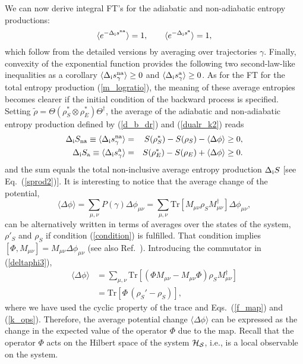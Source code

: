 \documentclass[aps,prx,twocolumn,showpacs,floatfix,superscriptaddress,graphics,longbibliography]{revtex4-1}
\newcommand{\tr}{\mathrm{Tr}}
\newcommand{\HAT}{}
\begin{document}
We can now derive integral FT's for the adiabatic and non-adiabatic entropy productions:
\begin{equation}\label{i-FT}
\langle e^{- \Delta_{\rm i} s^{\rm na}} \rangle = 1, \qquad \langle e^{- \Delta_{\rm i} s^{\rm a}} \rangle = 1,
\end{equation}
which follow from the detailed versions by averaging over trajectories $\gamma$. 
Finally, convexity of the exponential function provides the following two second-law-like inequalities as a corollary $\langle \Delta_{\rm i} s^{\rm na}_\gamma \rangle \ge 0$ and $\langle \Delta_{\rm i} s^{\rm a}_\gamma \rangle \ge 0$. 
As for the FT for the total entropy production (\ref{m_logratio}), the meaning of these average entropies becomes clearer if the initial condition of the backward process is specified. 
Setting $ \tilde{\rho}= \HAT\Theta (\rho_S^\ast \otimes \rho_E^*) \HAT\Theta^\dagger$, the average of the adiabatic and non-adiabatic entropy production defined by (\ref{d_b_dr}) and  (\ref{dualr_k2}) reads
\begin{eqnarray} \label{second-law-like1}
\Delta_{\rm i} S_{\rm na}\equiv \langle \Delta_{\rm i} s^{\rm na}_\gamma \rangle &=& S(\rho_S^\ast) - S(\rho_S) - \langle\Delta \phi\rangle \ge 0,  \\ \label{second-law-like2}
\Delta_{\rm i} S_{\rm a} \equiv\langle \Delta_{\rm i} s^{\rm a}_\gamma \rangle &=& S(\rho_E^\ast) - S(\rho_E) + \langle \Delta \phi \rangle \ge 0.
\end{eqnarray}
and the sum equals the total non-inclusive average entropy production $\Delta_{\rm i} S$ [see Eq.~(\ref{sprod2})].
It is interesting to notice that the average change of the potential,
\begin{equation}\label{deltaphi3}
\langle\Delta\phi\rangle = \sum_{\mu,\nu}P(\gamma)\Delta \phi_{\mu\nu} = \sum_{\mu,\nu}\tr[M_{\mu\nu}\rho_S M_{\mu\nu}^\dagger]\Delta \phi_{\mu\nu}, 
\end{equation}
can be alternatively written in terms of averages over the states of the system, $\rho'_S$ and $\rho_S$ if condition (\ref{condition}) is fulfilled. 
That condition implies $  [\HAT{\Phi}, \HAT{M}_{\mu \nu}]=\HAT{M}_{\mu \nu} \Delta \phi_{\mu \nu}$ (see also Ref.~\cite{MHP}). 
Introducing the commutator in (\ref{deltaphi3}),
\begin{align}\label{deltaphi4}
\langle\Delta\phi\rangle & = \sum_{\mu,\nu}\tr[(\HAT{\Phi} M_{\mu\nu}-M_{\mu\nu}\HAT{\Phi})\rho_S M_{\mu\nu}^\dagger] \nonumber \\
& = \tr [ \HAT{\Phi}\,(\rho_S'-\rho_S)],
\end{align}
where we have used the cyclic property of the trace and Eqs.~(\ref{f_map}) and  (\ref{k_ops}). 
Therefore, the average potential change $\langle\Delta\phi\rangle$ can be expressed as the change in the expected value of the operator $\HAT{\Phi}$ due to the map. 
Recall that the operator $\HAT{\Phi}$ acts on the Hilbert space of the system $\cal H_S$, i.e., is a local observable on the system. 
\end{document}
